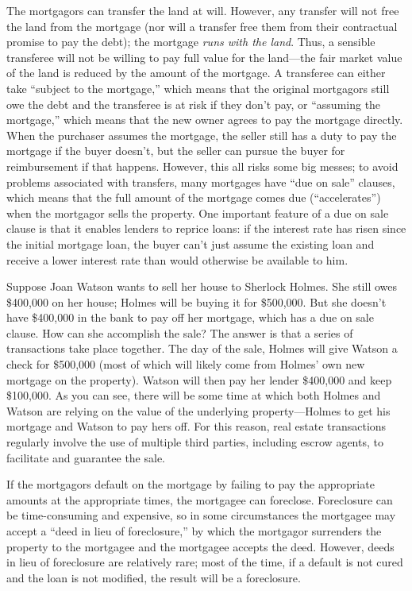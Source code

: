 The mortgagors can transfer the land at will.  However, any transfer will not
free the land from the mortgage (nor will a transfer free them from their
contractual promise to pay the debt); the mortgage \textit{runs with the land}.
 Thus, a sensible transferee will not be willing to pay full value for the
land---the fair market value of the land is reduced by the amount of the
mortgage. A transferee can either take ``subject to the mortgage,'' which means
that the original mortgagors still owe the debt and the transferee is at risk if
they don't pay, or ``assuming the mortgage,'' which means that the new owner
agrees to pay the mortgage directly.  When the purchaser assumes the mortgage,
the seller still has a duty to pay the mortgage if the buyer doesn't, but the
seller can pursue the buyer for reimbursement if that happens.  However, this
all risks some big messes; to avoid problems associated with transfers, many
mortgages have ``due on sale'' clauses, which means that the full amount of the
mortgage comes due (``accelerates'') when the mortgagor sells the property. One
important feature of a due on sale clause is that it enables lenders to reprice
loans: if the interest rate has risen since the initial mortgage loan, the buyer
can't just assume the existing loan and receive a lower interest rate than would
otherwise be available to him.

Suppose Joan Watson wants to sell her house to Sherlock Holmes.  She still owes
\$400,000 on her house; Holmes will be buying it for \$500,000.  But she
doesn't have \$400,000 in the bank to pay off her mortgage, which has a due on
sale clause.  How can she accomplish the sale?  The answer is that a series of
transactions take place together.  The day of the sale, Holmes will give Watson
a check for \$500,000 (most of which will likely come from Holmes' own new
mortgage on the property).  Watson will then pay her lender \$400,000 and keep
\$100,000.  As you can see, there will be some time at which both Holmes and
Watson are relying on the value of the underlying property---Holmes to get his
mortgage and Watson to pay hers off.  For this reason, real estate transactions
regularly involve the use of multiple third parties, including escrow agents,
to facilitate and guarantee the sale.  

If the mortgagors default on the mortgage by failing to pay the appropriate
amounts at the appropriate times, the mortgagee can foreclose.  Foreclosure can
be time-consuming and expensive, so in some circumstances the mortgagee may
accept a ``deed in lieu of foreclosure,'' by which the mortgagor surrenders the
property to the mortgagee and the mortgagee accepts the deed.  However, deeds
in lieu of foreclosure are relatively rare; most of the time, if a default is
not cured and the loan is not modified, the result will be a foreclosure.  

